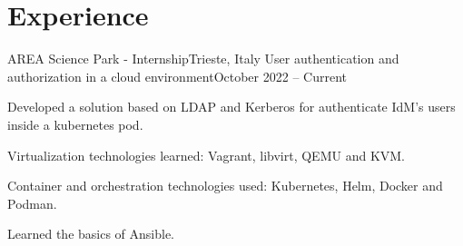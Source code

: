 \section{\textbf{Experience}}
  \resumeSubHeadingListStart
    \resumeSubheading
      {AREA Science Park - Internship}{Trieste, Italy}
      {User authentication and authorization in a cloud environment}{October 2022 -- Current}
      \vspace{-2.0mm}
      \resumeItemListStart
        \item {Developed a solution based on LDAP and Kerberos for authenticate IdM's users inside a kubernetes pod.}
        \item {Virtualization technologies learned: Vagrant, libvirt, QEMU and KVM.}
        \item {Container and orchestration technologies used: Kubernetes, Helm, Docker and Podman.}
        \item {Learned the basics of Ansible.}
      \resumeItemListEnd
    
    \vspace{-3.0mm}
      
  \resumeSubHeadingListEnd